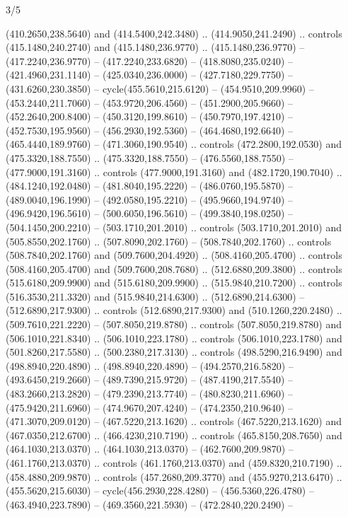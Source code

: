 \begin{flagdescription}{3/5}
\begin{scope}[shift={(0.5\flaglength,0.5\flagwidth)},scale=\flagwidth/510]
\begin{scope}[y=0.80pt, x=0.80pt, yscale=-1.06, xscale=1.06,yshift=-240pt,xshift=-400pt]
\begin{scope}[cm={{0.83333,0.0,0.0,0.83333,(154.64672,48.64761)}}]
\begin{scope}[cm={{0.93334,0.0,0.0,0.93334,(-4.86471,22.64035)}}]
\begin{scope}[line width=0.489\lw]
\begin{scope}[draw=c003300,fill=c338a00]
  (410.2650,238.5640) and (414.5400,242.3480) .. (414.9050,241.2490) .. controls
  (415.1480,240.2740) and (415.1480,236.9770) .. (415.1480,236.9770) --
  (417.2240,236.9770) -- (417.2240,233.6820) -- (418.8080,235.0240) --
  (421.4960,231.1140) -- (425.0340,236.0000) -- (427.7180,229.7750) --
  (431.6260,230.3850) -- cycle(455.5610,215.6120) -- (454.9510,209.9960) --
  (453.2440,211.7060) -- (453.9720,206.4560) -- (451.2900,205.9660) --
  (452.2640,200.8400) -- (450.3120,199.8610) -- (450.7970,197.4210) --
  (452.7530,195.9560) -- (456.2930,192.5360) -- (464.4680,192.6640) --
  (465.4440,189.9760) -- (471.3060,190.9540) .. controls (472.2800,192.0530) and
  (475.3320,188.7550) .. (475.3320,188.7550) -- (476.5560,188.7550) --
  (477.9000,191.3160) .. controls (477.9000,191.3160) and (482.1720,190.7040) ..
  (484.1240,192.0480) -- (481.8040,195.2220) -- (486.0760,195.5870) --
  (489.0040,196.1990) -- (492.0580,195.2210) -- (495.9660,194.9740) --
  (496.9420,196.5610) -- (500.6050,196.5610) -- (499.3840,198.0250) --
  (504.1450,200.2210) -- (503.1710,201.2010) .. controls (503.1710,201.2010) and
  (505.8550,202.1760) .. (507.8090,202.1760) -- (508.7840,202.1760) .. controls
  (508.7840,202.1760) and (509.7600,204.4920) .. (508.4160,205.4700) .. controls
  (508.4160,205.4700) and (509.7600,208.7680) .. (512.6880,209.3800) .. controls
  (515.6180,209.9900) and (515.6180,209.9900) .. (515.9840,210.7200) .. controls
  (516.3530,211.3320) and (515.9840,214.6300) .. (512.6890,214.6300) --
  (512.6890,217.9300) .. controls (512.6890,217.9300) and (510.1260,220.2480) ..
  (509.7610,221.2220) -- (507.8050,219.8780) .. controls (507.8050,219.8780) and
  (506.1010,221.8340) .. (506.1010,223.1780) .. controls (506.1010,223.1780) and
  (501.8260,217.5580) .. (500.2380,217.3130) .. controls (498.5290,216.9490) and
  (498.8940,220.4890) .. (498.8940,220.4890) -- (494.2570,216.5820) --
  (493.6450,219.2660) -- (489.7390,215.9720) -- (487.4190,217.5540) --
  (483.2660,213.2820) -- (479.2390,213.7740) -- (480.8230,211.6960) --
  (475.9420,211.6960) -- (474.9670,207.4240) -- (474.2350,210.9640) --
  (471.3070,209.0120) -- (467.5220,213.1620) .. controls (467.5220,213.1620) and
  (467.0350,212.6700) .. (466.4230,210.7190) .. controls (465.8150,208.7650) and
  (464.1030,213.0370) .. (464.1030,213.0370) -- (462.7600,209.9870) --
  (461.1760,213.0370) .. controls (461.1760,213.0370) and (459.8320,210.7190) ..
  (458.4880,209.9870) .. controls (457.2680,209.3770) and (455.9270,213.6470) ..
  (455.5620,215.6030) -- cycle(456.2930,228.4280) -- (456.5360,226.4780) --
  (463.4940,223.7890) -- (469.3560,221.5930) -- (472.2840,220.2490) --

\end{scope}
\end{scope}
\end{scope}
\end{scope}
\end{scope}
\end{scope}
\end{flagdescription}
